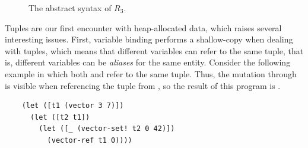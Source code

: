 \documentclass[11pt]{book}
\newcommand{\gray}[1]{{\color{gray} #1}}
\begin{document}
\begin{figure}[tp]
\centering
\fbox{
\begin{minipage}{0.96\textwidth}
\[
\begin{array}{lcl}
  \itm{bool} &::=& \key{\#t} \mid \key{\#f} \\
  \itm{cmp} &::= & \key{eq?} \mid \key{<} \mid \key{<=} \mid \key{>} \mid \key{>=} \\
\Exp &::=& \gray{ \INT{\Int} \mid \READ{} \mid \NEG{\Exp} } \\
     &\mid& \gray{ \ADD{\Exp}{\Exp} 
      \mid \BINOP{\code{'-}}{\Exp}{\Exp} } \\
     &\mid& \gray{ \VAR{\Var} \mid \LET{\Var}{\Exp}{\Exp} } \\
     &\mid& \gray{ \BOOL{\itm{bool}} 
      \mid \AND{\Exp}{\Exp} }\\
     &\mid& \gray{ \OR{\Exp}{\Exp}
      \mid \NOT{\Exp} } \\
     &\mid& \gray{ \BINOP{\code{'}\itm{cmp}}{\Exp}{\Exp}
      \mid \IF{\Exp}{\Exp}{\Exp} } \\
     &\mid& \VECTOR{\Exp} \\
     &\mid& \VECREF{\Exp}{\Int}\\
     &\mid& \VECSET{\Exp}{\Int}{\Exp}\\
      &\mid& \VOID{} \\
  R_3 &::=& \PROGRAM{\key{'()}}{\Exp}
\end{array}
\]
\end{minipage}
}
\caption{The abstract syntax of $R_3$.}
\label{fig:r3-syntax}
\end{figure}


Tuples are our first encounter with heap-allocated data, which raises
several interesting issues. First, variable binding performs a
shallow-copy when dealing with tuples, which means that different
variables can refer to the same tuple, that is, different variables
can be \emph{aliases} for the same entity. Consider the following
example in which both  and  refer to the same tuple.
Thus, the mutation through  is visible when referencing the
tuple from , so the result of this program is .
\begin{center}
\begin{minipage}{0.96\textwidth}
\begin{lstlisting}
    (let ([t1 (vector 3 7)])
      (let ([t2 t1])
        (let ([_ (vector-set! t2 0 42)])
          (vector-ref t1 0))))
\end{lstlisting}
\end{minipage}
\end{center}
\end{document}
